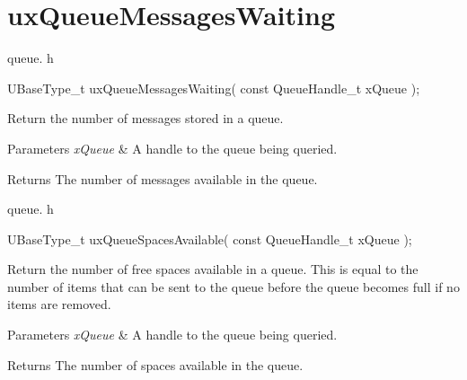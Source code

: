 \hypertarget{group__uxQueueMessagesWaiting}{}\section{ux\+Queue\+Messages\+Waiting}
\label{group__uxQueueMessagesWaiting}
queue. h 
\begin{DoxyPre}UBaseType\_t uxQueueMessagesWaiting( const QueueHandle\_t xQueue );\end{DoxyPre}


Return the number of messages stored in a queue.


\begin{DoxyParams}{Parameters}
{\em x\+Queue} & A handle to the queue being queried.\\
\hline
\end{DoxyParams}
\begin{DoxyReturn}{Returns}
The number of messages available in the queue.
\end{DoxyReturn}
queue. h 
\begin{DoxyPre}UBaseType\_t uxQueueSpacesAvailable( const QueueHandle\_t xQueue );\end{DoxyPre}


Return the number of free spaces available in a queue. This is equal to the number of items that can be sent to the queue before the queue becomes full if no items are removed.


\begin{DoxyParams}{Parameters}
{\em x\+Queue} & A handle to the queue being queried.\\
\hline
\end{DoxyParams}
\begin{DoxyReturn}{Returns}
The number of spaces available in the queue. 
\end{DoxyReturn}
